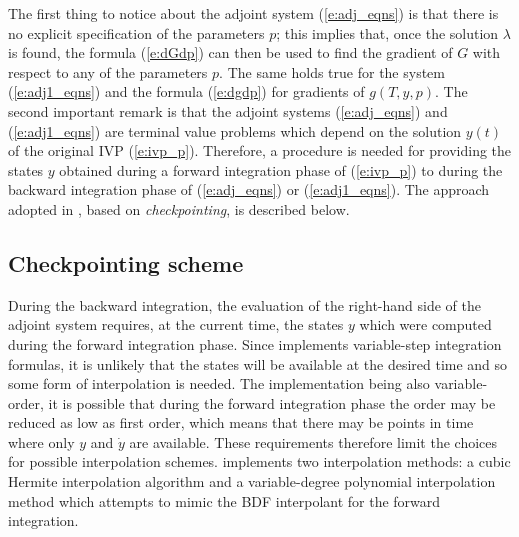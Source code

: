The first thing to notice about the adjoint system (\ref{e:adj_eqns}) is that there
is no explicit specification of the parameters $p$; this implies that, once the
solution $\lambda$ is found, the formula (\ref{e:dGdp}) can then be used to find
the gradient of $G$ with respect to any of the parameters $p$. The same holds true
for the system (\ref{e:adj1_eqns}) and the formula (\ref{e:dgdp}) for gradients of
$g(T,y,p)$.  The second important remark is that the adjoint systems
(\ref{e:adj_eqns}) and (\ref{e:adj1_eqns}) are terminal value problems which depend
on the solution $y(t)$ of the original IVP (\ref{e:ivp_p}). Therefore, a procedure
is needed for providing the states $y$ obtained during a forward integration phase
of (\ref{e:ivp_p}) to {\cvodes} during the backward integration phase of
(\ref{e:adj_eqns}) or (\ref{e:adj1_eqns}).  The approach adopted in {\cvodes},
based on {\em checkpointing}, is described below.

\subsection{Checkpointing scheme}\label{ss:checkpointing}
During the backward integration, the evaluation of the right-hand side 
of the adjoint system requires, at the current time, the states $y$ which
were computed during the forward integration phase.
Since {\cvodes} implements variable-step integration formulas,
it is unlikely that the states will be available at the desired time and
so some form of interpolation is needed. The {\cvodes} implementation
being also variable-order, it is possible that during the forward
integration phase the order may be reduced as low as first order,
which means that there may be points in time where only $y$ and ${\dot y}$
are available. These requirements therefore limit the choices for possible
interpolation schemes.
{\cvodes} implements two interpolation methods: a cubic Hermite interpolation
algorithm and a variable-degree polynomial interpolation method which attempts 
to mimic the BDF interpolant for the forward integration.

